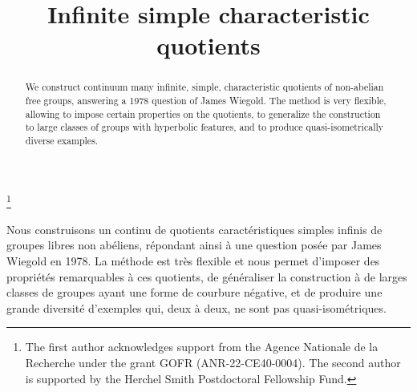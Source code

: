 \documentclass[JEP,XML,SOM,Unicode]{cedram}
\theoremstyle{definition}
\begin{document}
\frontmatter
\title{Infinite simple characteristic quotients}

\author[\initial{R.} \lastname{Coulon}]{ }
\address{Université Bourgogne Europe, CNRS, IMB UMR 5584,\\
21000 Dijon, France}

\author[\initial{F.} \lastname{Fournier-Facio}]{ }
\address{Department of Pure Mathematics and Mathematical Statistics, University of Cambridge,\\
Wilberforce Road,
Cambridge CB3 0WA, UK}

\thanks{The first author acknowledges support from the Agence Nationale de la Recherche under the grant GOFR (ANR-22-CE40-0004).
The second author is supported by the Herchel Smith Postdoctoral Fellowship Fund.}

\begin{abstract}
We construct continuum many infinite, simple, characteristic quotients of non-abelian free groups, answering a 1978 question of James Wiegold. The method is very flexible, allowing to impose certain properties on the quotients, to generalize the construction to large classes of groups with hyperbolic features, and to produce quasi-isometrically diverse examples.
\end{abstract}





\begin{altabstract}
Nous construisons un continu de quotients caractéristiques simples infinis de groupes libres non abéliens, répondant ainsi à une question posée par James Wiegold en 1978. La méthode est très flexible et nous permet d'imposer des propriétés remarquables à ces quotients, de généraliser la construction à de larges classes de groupes ayant une forme de courbure négative, et de produire une grande diversité d'exemples qui, deux à deux, ne sont pas quasi-isométriques.
\end{altabstract}
\end{document}
